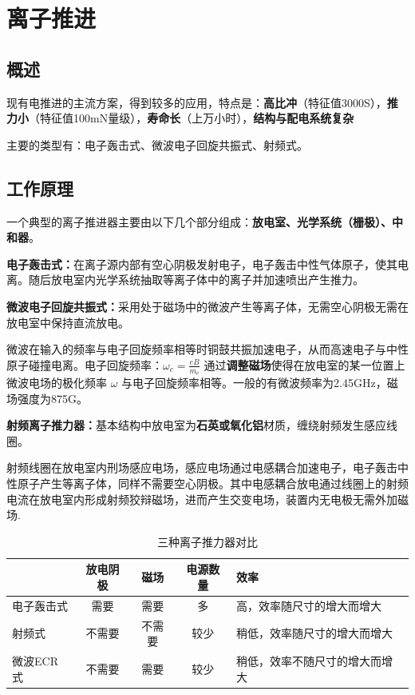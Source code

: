 \chapter{离子推进}

\section{概述}

  现有电推进的主流方案，得到较多的应用，特点是：\textbf{高比冲}（特征值3000S），\textbf{推力小}（特征值100mN量级），\textbf{寿命长}（上万小时），\textbf{结构与配电系统复杂}
  
  主要的类型有：电子轰击式、微波电子回旋共振式、射频式。

\section{工作原理}
  一个典型的离子推进器主要由以下几个部分组成：\textbf{放电室、光学系统（栅极）、中和器}。

  \textbf{电子轰击式：}在离子源内部有空心阴极发射电子，电子轰击中性气体原子，使其电离。随后放电室内光学系统抽取等离子体中的离子并加速喷出产生推力。

  \textbf{微波电子回旋共振式：}采用处于磁场中的微波产生等离子体，无需空心阴极无需在放电室中保持直流放电。
  
  微波在输入的频率与电子回旋频率相等时铜鼓共振加速电子，从而高速电子与中性原子碰撞电离。电子回旋频率：$ \omega_c = \frac{eB}{m_e} $ 通过\textbf{调整磁场}使得在放电室的某一位置上微波电场的极化频率 $\omega$ 与电子回旋频率相等。一般的有微波频率为2.45GHz，磁场强度为875G。

  \textbf{射频离子推力器：}基本结构中放电室为\textbf{石英或氧化铝}材质，缠绕射频发生感应线圈。

  射频线圈在放电室内刑场感应电场，感应电场通过电感耦合加速电子，电子轰击中性原子产生等离子体，同样不需要空心阴极。其中电感耦合放电通过线圈上的射频电流在放电室内形成射频狡辩磁场，进而产生交变电场，装置内无电极无需外加磁场.

  \begin{table}[htbp]
    \centering
    \caption{三种离子推力器对比}
    \begin{tabular}{lcccl}
      \toprule
      & 放电阴极 & 磁场 & 电源数量 & 效率 \\
      \midrule
      电子轰击式 & 需要 & 需要 & 多 & 高，效率随尺寸的增大而增大 \\
      射频式     & 不需要 & 不需要 & 较少 & 稍低，效率随尺寸的增大而增大 \\
      微波ECR式  & 不需要 & 需要 & 较少 & 稍低，效率不随尺寸的增大而增大 \\
      \bottomrule
    \end{tabular}
  \end{table}

